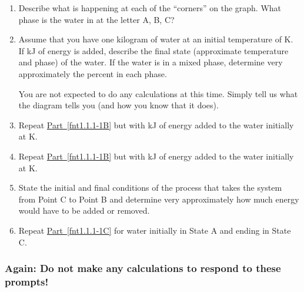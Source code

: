 \begin{enumerate}
	\item Describe what is happening at each of the ``corners'' on the graph. What phase is the water in at the letter A, B, C?
	\label{fnt1.1.1-1A}
	
	\item Assume that you have one kilogram of water at an initial temperature of \unit[200]{K}. If \unit[795]{kJ} of energy is added, describe the final state (approximate temperature and phase) of the water. If the water is in a mixed phase, determine very approximately the percent in each phase.
	
		You are not expected to do any calculations at this time. Simply tell us what the diagram tells you (and how you know that it does).
	\label{fnt1.1.1-1B}
	
	\item Repeat \hyperref[fnt1.1.1-1B]{Part~\ref*{fnt1.1.1-1B}} but with \unit[146]{kJ} of energy added to the water initially at \unit[200]{K}.
	
	\item Repeat \hyperref[fnt1.1.1-1B]{Part~\ref*{fnt1.1.1-1B}} but with \unit[1650]{kJ} of energy added to the water initially at \unit[200]{K}.
	
	\item State the initial and final conditions of the process that takes the system from Point C to Point B and determine very approximately how much energy would have to be added or removed.
	\label{fnt1.1.1-1C}
	
	\item Repeat \hyperref[fnt1.1.1-1C]{Part~\ref*{fnt1.1.1-1C}} for water initially in State A and ending in State C.
	\label{fnt1.1.1-1D}
	
\end{enumerate}

\subsubsection*{Again: Do not make any calculations to respond to these prompts!}